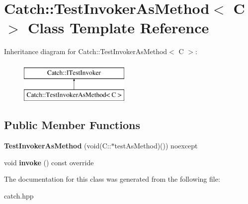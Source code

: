 \hypertarget{class_catch_1_1_test_invoker_as_method}{}\section{Catch\+:\+:Test\+Invoker\+As\+Method$<$ C $>$ Class Template Reference}
\label{class_catch_1_1_test_invoker_as_method}
Inheritance diagram for Catch\+:\+:Test\+Invoker\+As\+Method$<$ C $>$\+:\begin{figure}[H]
\begin{center}
\leavevmode
\includegraphics[height=2.000000cm]{class_catch_1_1_test_invoker_as_method}
\end{center}
\end{figure}
\subsection*{Public Member Functions}
\begin{DoxyCompactItemize}
\item 
\mbox{\label{class_catch_1_1_test_invoker_as_method_a119c4bdbbdd95c42859c18541987a1a4}} 
{\bfseries Test\+Invoker\+As\+Method} (void(C\+::$\ast$test\+As\+Method)()) noexcept
\item 
\mbox{\label{class_catch_1_1_test_invoker_as_method_a8115a06efe273f4112ec0b5452c1b5f2}} 
void {\bfseries invoke} () const override
\end{DoxyCompactItemize}


The documentation for this class was generated from the following file\+:\begin{DoxyCompactItemize}
\item 
catch.\+hpp\end{DoxyCompactItemize}
